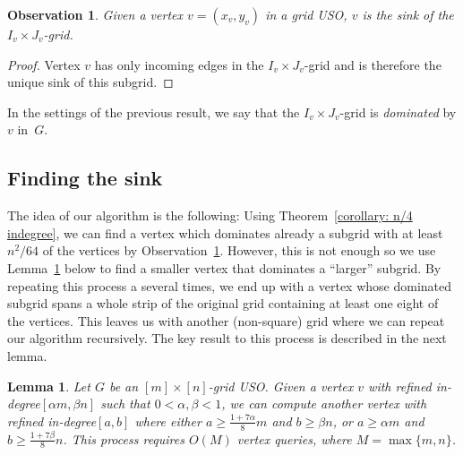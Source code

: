\documentclass[a4paper,10pt]{article}
\newtheorem{observation}{Observation}
\newtheorem{lemma}{Lemma}
\newcommand{\indegree}{refined in-degree\xspace}
\begin{document}
\begin{observation}\label{Obs:Sink of dominated grid}
Given a vertex  $v = (x_v, y_v)$ in a grid USO, $v$ is the sink of the $I_v\times J_v$-grid.
\end{observation}
\begin{proof}
Vertex $v$ has only incoming edges in the $I_v\times J_v$-grid and is therefore the unique sink of this subgrid. 
\end{proof}

In the settings of the previous result, we say that the $I_v\times J_v$-grid is \emph{dominated} by $v$ in~$G$.

\subsection{Finding the sink}
The idea of our algorithm is the following: Using Theorem~\ref{corollary: n/4 indegree}, we can find a vertex which dominates already a subgrid with at least $n^2/64$ of the vertices by Observation~\ref{Obs:Sink of dominated grid}. However, this is not enough so we use Lemma~\ref{lemma:Constant fraction improvement} below to find a smaller vertex that dominates a ``larger'' subgrid. By repeating this process a several times, we end up with a vertex whose dominated subgrid spans a whole strip of the original grid containing at least one eight of the vertices. This leaves us with another (non-square) grid where we can repeat our algorithm recursively. The key result to this process is described in the next lemma.


\begin{lemma}\label{lemma:Constant fraction improvement}
Let $G$ be an $[m]\times[n]$-grid USO. 
Given a vertex $v$ with \indegree $[\alpha m, \beta n]$ such that $0 < \alpha, \beta < 1$, we can compute another vertex with \indegree $[a,b]$ where either $a\geq \frac{1+7\alpha}{8}m$ and $b \geq \beta n$, or $a \geq \alpha m$ and $b \geq \frac{1 + 7\beta}{8}n$. This process requires $O(M)$ vertex queries, where $M = \max\{m,n\}$.
\end{lemma}
\end{document}
